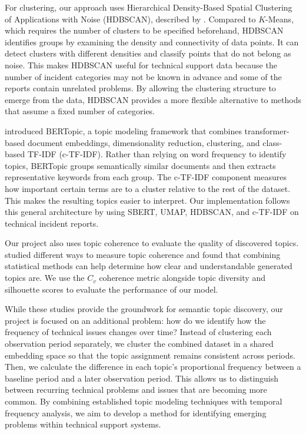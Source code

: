 \documentclass[11pt]{article}
\begin{document}
For clustering, our approach uses Hierarchical Density-Based Spatial Clustering of Applications with Noise (HDBSCAN), described by \citet{mcinnes2017hdbscan}. Compared to $K$-Means, which requires the number of clusters to be specified beforehand, HDBSCAN identifies groups by examining the density and connectivity of data points. It can detect clusters with different densities and classify points that do not belong as noise. This makes HDBSCAN useful for technical support data because the number of incident categories may not be known in advance and some of the reports contain unrelated problems. By allowing the clustering structure to emerge from the data, HDBSCAN provides a more flexible alternative to methods that assume a fixed number of categories.

\citet{grootendorst2022bertopic} introduced BERTopic, a topic modeling framework that combines transformer-based document embeddings, dimensionality reduction, clustering, and class-based TF-IDF (c-TF-IDF). Rather than relying on word frequency to identify topics, BERTopic groups semantically similar documents and then extracts representative keywords from each group. The c-TF-IDF component measures how important certain terms are to a cluster relative to the rest of the dataset. This makes the resulting topics easier to interpret. Our implementation follows this general architecture by using SBERT, UMAP, HDBSCAN, and c-TF-IDF on technical incident reports.

Our project also uses topic coherence to evaluate the quality of discovered topics. \citet{roder2015exploring} studied different ways to measure topic coherence and found that combining statistical methods can help determine how clear and understandable generated topics are. We use the $C_v$ coherence metric alongside topic diversity and silhouette scores to evaluate the performance of our model.

While these studies provide the groundwork for semantic topic discovery, our project is focused on an additional problem: how do we identify how the frequency of technical issues changes over time? Instead of clustering each observation period separately, we cluster the combined dataset in a shared embedding space so that the topic assignment remains consistent across periods. Then, we calculate the difference in each topic's proportional frequency between a baseline period and a later observation period. This allows us to distinguish between recurring technical problems and issues that are becoming more common. By combining established topic modeling techniques with temporal frequency analysis, we aim to develop a method for identifying emerging problems within technical support systems.
\end{document}
